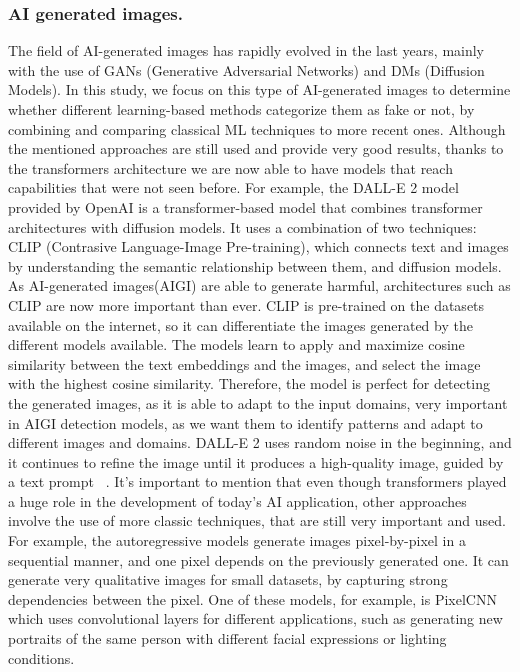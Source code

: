 \documentclass[runningheads]{llncs}
\begin{document}
\subsubsection{AI generated images.} The field of AI-generated images has rapidly evolved in the last years, mainly with the use of GANs (Generative Adversarial Networks) and DMs (Diffusion Models). In this study, we focus on this type of AI-generated images to determine whether different learning-based methods categorize them as fake or not, by combining and comparing classical ML techniques to more recent ones. Although the mentioned approaches are still used and provide very good results, thanks to the transformers architecture we are now able to have models that reach capabilities that were not seen before. For example, the DALL-E 2 model provided by OpenAI is a transformer-based model that combines transformer architectures with diffusion models. It uses a combination of two techniques: CLIP (Contrasive Language-Image Pre-training), which connects text and images by understanding the semantic relationship between them, and diffusion models. As AI-generated images(AIGI) are able to generate harmful, architectures such as CLIP are now more important than ever. CLIP is pre-trained on the datasets available on the internet, so it can differentiate the images generated by the different models available. The models learn to apply and maximize cosine similarity between the text embeddings and the images, and select the image with the highest cosine similarity. Therefore, the model is perfect for detecting the generated images, as it is able to adapt to the input domains, very important in AIGI detection models, as we want them to identify patterns and adapt to different images and domains\cite{moskowitz2024clip}. DALL-E 2 uses random noise in the beginning, and it continues to refine the image until it produces a high-quality image, guided by a text prompt ~\cite{ramesh2022clip}. It's important to mention that even though transformers played a huge role in the development of today's AI application, other approaches involve the use of more classic techniques, that are still very important and used. For example, the autoregressive models generate images pixel-by-pixel in a sequential manner, and one pixel depends on the previously generated one. It can generate very qualitative images for small datasets, by capturing strong dependencies between the pixel. One of these models, for example, is PixelCNN which uses convolutional layers for different applications, such as generating new portraits of the same person with different facial expressions or lighting conditions\cite{oord2016pixelcnn}.
\end{document}
